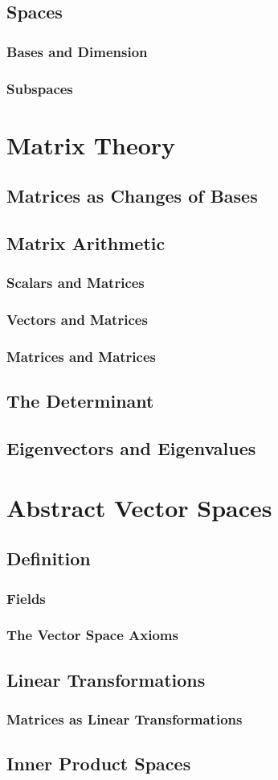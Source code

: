 \documentclass[cm, 10pt, titlepage, oneside]{book}
\begin{document}
  \section{Spaces}
    \subsection{Bases and Dimension}
    \subsection{Subspaces}

\chapter{Matrix Theory}
  \section{Matrices as Changes of Bases}
  \section{Matrix Arithmetic}
    \subsection{Scalars and Matrices}
    \subsection{Vectors and Matrices}
    \subsection{Matrices and Matrices}
  \section{The Determinant}
  \section{Eigenvectors and Eigenvalues}

\chapter{Abstract Vector Spaces}
  \section{Definition}
    \subsection{Fields}
    \subsection{The Vector Space Axioms}
  \section{Linear Transformations}
    \subsection{Matrices as Linear Transformations}
  \section{Inner Product Spaces}
\end{document}
